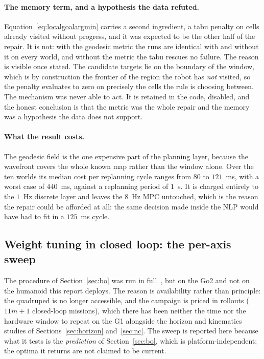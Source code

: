 \documentclass[11pt,a4paper]{article}
\begin{document}
\paragraph{The memory term, and a hypothesis the data refuted.} Equation~\eqref{eq:localgoalargmin} carries a
second ingredient, a tabu penalty on cells already visited without progress, and it was expected to be the
other half of the repair. It is not: with the geodesic metric the runs are identical with and without it on
every world, and without the metric the tabu rescues no failure. The reason is visible once stated. The
candidate targets lie on the boundary of the window, which is by construction the frontier of the region the
robot has \emph{not} visited, so the penalty evaluates to zero on precisely the cells the rule is choosing
between. The mechanism was never able to act. It is retained in the code, disabled, and the honest
conclusion is that the metric was the whole repair and the memory was a hypothesis the data does not
support.

\paragraph{What the result costs.} The geodesic field is the one expensive part of the planning layer,
because the wavefront covers the whole known map rather than the window alone. Over the ten worlds its
median cost per replanning cycle ranges from $80$ to $121$~ms, with a worst case of $440$~ms, against a
replanning period of $1$~s. It is charged entirely to the $1$~Hz discrete layer and leaves the $8$~Hz MPC
untouched, which is the reason the repair could be afforded at all: the same decision made inside the NLP
would have had to fit in a $125$~ms cycle.
\subsection{Weight tuning in closed loop: the per-axis sweep}
\label{sec:ofat}

The procedure of Section~\ref{sec:bo} was run in full~\cite{ortolani2026bo}, but on the Go2 and not on the humanoid this report
deploys. The reason is availability rather than principle: the quadruped is no longer accessible, and the
campaign is priced in rollouts ($11m+1$ closed-loop missions), which there has been neither the time nor
the hardware window to repeat on the G1 alongside the horizon and kinematics studies of
Sections~\ref{sec:horizon} and~\ref{sec:nc}. The sweep is reported here because what it tests is the
\emph{prediction} of Section~\ref{sec:bo}, which is platform-independent; the optima it returns are not
claimed to be current.
\end{document}
